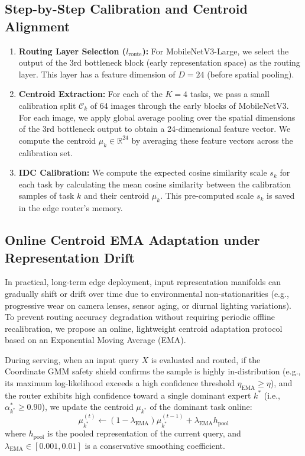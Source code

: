 \documentclass{article}
\theoremstyle{plain}
\theoremstyle{definition}
\theoremstyle{remark}
\begin{document}
\subsection{Step-by-Step Calibration and Centroid Alignment}
\begin{enumerate}
    \item \textbf{Routing Layer Selection ($l_{\text{route}}$):} For MobileNetV3-Large, we select the output of the 3rd bottleneck block (early representation space) as the routing layer. This layer has a feature dimension of $D = 24$ (before spatial pooling).
    \item \textbf{Centroid Extraction:} For each of the $K=4$ tasks, we pass a small calibration split $\mathcal{C}_k$ of 64 images through the early blocks of MobileNetV3. For each image, we apply global average pooling over the spatial dimensions of the 3rd bottleneck output to obtain a 24-dimensional feature vector. We compute the centroid $\mu_k \in \mathbb{R}^{24}$ by averaging these feature vectors across the calibration set.
    \item \textbf{IDC Calibration:} We compute the expected cosine similarity scale $s_k$ for each task by calculating the mean cosine similarity between the calibration samples of task $k$ and their centroid $\mu_k$. This pre-computed scale $s_k$ is saved in the edge router's memory.
\end{enumerate}

\subsection{Online Centroid EMA Adaptation under Representation Drift}
In practical, long-term edge deployment, input representation manifolds can gradually shift or drift over time due to environmental non-stationarities (e.g., progressive wear on camera lenses, sensor aging, or diurnal lighting variations). To prevent routing accuracy degradation without requiring periodic offline recalibration, we propose an online, lightweight centroid adaptation protocol based on an Exponential Moving Average (EMA).

During serving, when an input query $X$ is evaluated and routed, if the Coordinate GMM safety shield confirms the sample is highly in-distribution (e.g., its maximum log-likelihood exceeds a high confidence threshold $\eta_{\text{EMA}} \ge \eta$), and the router exhibits high confidence toward a single dominant expert $k^*$ (i.e., $\alpha^*_{k^*} \ge 0.90$), we update the centroid $\mu_{k^*}$ of the dominant task online:
\begin{equation}
\mu_{k^*}^{(t)} \gets (1 - \lambda_{\text{EMA}}) \mu_{k^*}^{(t-1)} + \lambda_{\text{EMA}} h_{\text{pool}}
\label{eq:ema_centroid}
\end{equation}
where $h_{\text{pool}}$ is the pooled representation of the current query, and $\lambda_{\text{EMA}} \in [0.001, 0.01]$ is a conservative smoothing coefficient. 
\end{document}
